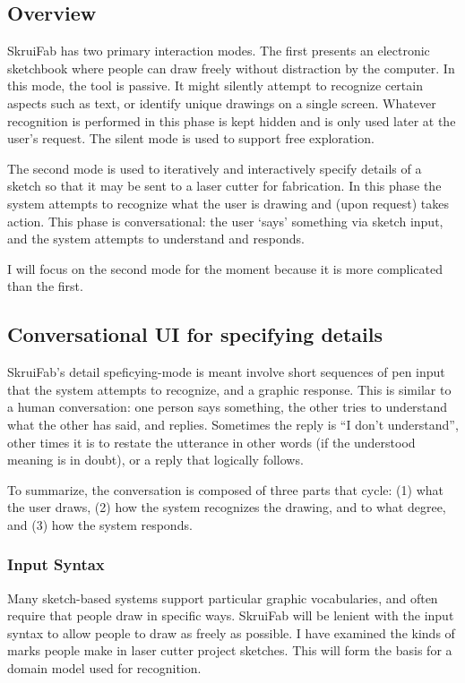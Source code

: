 \documentclass[12pt]{article}
\begin{document}
\subsection{Overview}

SkruiFab has two primary interaction modes. The first presents an
electronic sketchbook where people can draw freely without distraction
by the computer. In this mode, the tool is passive. It might silently
attempt to recognize certain aspects such as text, or identify unique
drawings on a single screen. Whatever recognition is performed in this
phase is kept hidden and is only used later at the user's request. The
silent mode is used to support free exploration.

The second mode is used to iteratively and interactively specify
details of a sketch so that it may be sent to a laser cutter for
fabrication. In this phase the system attempts to recognize what the
user is drawing and (upon request) takes action. This phase is
conversational: the user `says' something via sketch input, and the
system attempts to understand and responds.

I will focus on the second mode for the moment because it is more
complicated than the first.

\subsection{Conversational UI for specifying details}

SkruiFab's detail speficying-mode is meant involve short sequences of
pen input that the system attempts to recognize, and a graphic
response. This is similar to a human conversation: one person says
something, the other tries to understand what the other has said, and
replies. Sometimes the reply is ``I don't understand'', other times it
is to restate the utterance in other words (if the understood meaning
is in doubt), or a reply that logically follows.

To summarize, the conversation is composed of three parts that cycle:
(1) what the user draws, (2) how the system recognizes the drawing,
and to what degree, and (3) how the system responds.

\subsubsection{Input Syntax}

Many sketch-based systems support particular graphic vocabularies, and
often require that people draw in specific ways. SkruiFab will be
lenient with the input syntax to allow people to draw as freely as
possible. I have examined the kinds of marks people make in laser
cutter project sketches. This will form the basis for a domain model
used for recognition.
\end{document}
